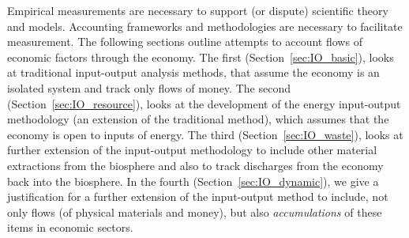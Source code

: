 Empirical measurements are necessary to support
(or dispute) scientific theory and models.
Accounting frameworks and methodologies are necessary
to facilitate measurement.
The following sections outline attempts to
account flows of economic factors through the
economy. 
The first (Section~\ref{sec:IO_basic}),
looks at traditional input-output analysis methods, 
that assume the economy is an isolated system 
and track only flows of money.
The second (Section~\ref{sec:IO_resource}),
looks at the development of the energy input-output methodology
(an extension of the traditional method),
which assumes that the economy is open to inputs of energy.
The third (Section~\ref{sec:IO_waste}),
looks at further extension of the input-output methodology
to include other material extractions from the biosphere and also
to track discharges from the economy back into the biosphere.
In the fourth (Section~\ref{sec:IO_dynamic}),
we give a justification for a further extension of the input-output
method to include,
not only flows (of physical materials and money),
but also \emph{accumulations} of these items
in economic sectors.
%
%
%
%
%
%



